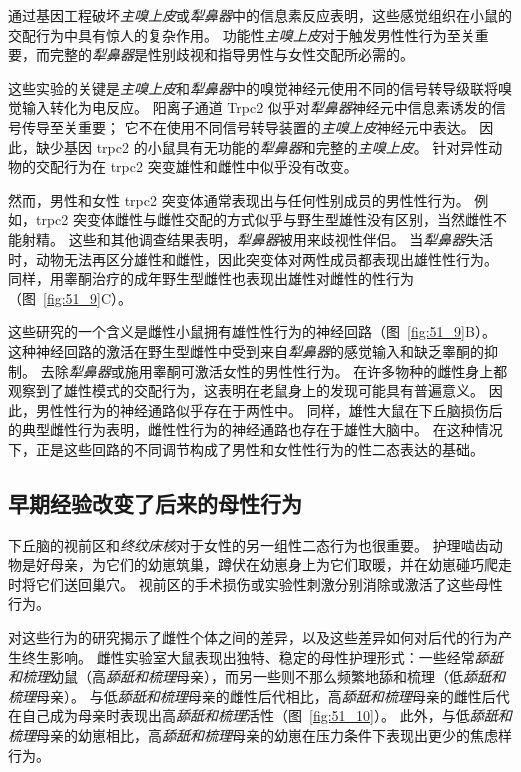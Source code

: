 通过基因工程破坏\textit{主嗅上皮}或\textit{犁鼻器}中的信息素反应表明，这些感觉组织在小鼠的交配行为中具有惊人的复杂作用。
功能性\textit{主嗅上皮}对于触发男性性行为至关重要，而完整的\textit{犁鼻器}是性别歧视和指导男性与女性交配所必需的。


这些实验的关键是\textit{主嗅上皮}和\textit{犁鼻器}中的嗅觉神经元使用不同的信号转导级联将嗅觉输入转化为电反应。
阳离子通道 Trpc2 似乎对\textit{犁鼻器}神经元中信息素诱发的信号传导至关重要；
它不在使用不同信号转导装置的\textit{主嗅上皮}神经元中表达。
因此，缺少基因 trpc2 的小鼠具有无功能的\textit{犁鼻器}和完整的\textit{主嗅上皮}。
针对异性动物的交配行为在 trpc2 突变雄性和雌性中似乎没有改变。


然而，男性和女性 trpc2 突变体通常表现出与任何性别成员的男性性行为。
例如，trpc2 突变体雌性与雌性交配的方式似乎与野生型雄性没有区别，当然雌性不能射精。
这些和其他调查结果表明，\textit{犁鼻器}被用来歧视性伴侣。
当\textit{犁鼻器}失活时，动物无法再区分雄性和雌性，因此突变体对两性成员都表现出雄性性行为。
同样，用睾酮治疗的成年野生型雌性也表现出雄性对雌性的性行为（图~\ref{fig:51_9}C）。


这些研究的一个含义是雌性小鼠拥有雄性性行为的神经回路（图~\ref{fig:51_9}B）。
这种神经回路的激活在野生型雌性中受到来自\textit{犁鼻器}的感觉输入和缺乏睾酮的抑制。
去除\textit{犁鼻器}或施用睾酮可激活女性的男性性行为。
在许多物种的雌性身上都观察到了雄性模式的交配行为，这表明在老鼠身上的发现可能具有普遍意义。
因此，男性性行为的神经通路似乎存在于两性中。
同样，雄性大鼠在下丘脑损伤后的典型雌性行为表明，雌性性行为的神经通路也存在于雄性大脑中。
在这种情况下，正是这些回路的不同调节构成了男性和女性性行为的性二态表达的基础。



\subsection{早期经验改变了后来的母性行为}

下丘脑的视前区和\textit{终纹床核}对于女性的另一组性二态行为也很重要。
护理啮齿动物是好母亲，为它们的幼崽筑巢，蹲伏在幼崽身上为它们取暖，并在幼崽碰巧爬走时将它们送回巢穴。
视前区的手术损伤或实验性刺激分别消除或激活了这些母性行为。


对这些行为的研究揭示了雌性个体之间的差异，以及这些差异如何对后代的行为产生终生影响。
雌性实验室大鼠表现出独特、稳定的母性护理形式：一些经常\textit{舔舐和梳理}幼鼠（高\textit{舔舐和梳理}母亲），而另一些则不那么频繁地舔和梳理（低\textit{舔舐和梳理}母亲）。
与低\textit{舔舐和梳理}母亲的雌性后代相比，高\textit{舔舐和梳理}母亲的雌性后代在自己成为母亲时表现出高\textit{舔舐和梳理}活性（图~\ref{fig:51_10}）。
此外，与低\textit{舔舐和梳理}母亲的幼崽相比，高\textit{舔舐和梳理}母亲的幼崽在压力条件下表现出更少的焦虑样行为。


